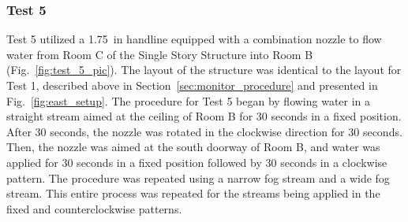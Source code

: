 \documentclass[12pt,oneside]{book}
\begin{document}
\subsubsection{Test 5}
Test 5 utilized a 1.75~in handline equipped with a combination nozzle to flow water from Room C of the Single Story Structure into Room B (Fig.~\ref{fig:test_5_pic}). The layout of the structure was identical to the layout for Test 1, described above in Section~\ref{sec:monitor_procedure} and presented in Fig.~\ref{fig:east_setup}. The procedure for Test 5 began by flowing water in a straight stream aimed at the ceiling of Room B for 30 seconds in a fixed position. After 30 seconds, the nozzle was rotated in the clockwise direction for 30 seconds. Then, the nozzle was aimed at the south doorway of Room B, and water was applied for 30 seconds in a fixed position followed by 30 seconds in a clockwise pattern. The procedure was repeated using a narrow fog stream and a wide fog stream. This entire process was repeated for the streams being applied in the fixed and counterclockwise patterns.
\end{document}

